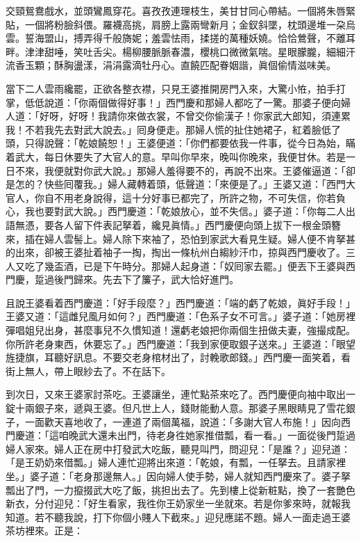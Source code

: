 \begin{myquote} 
交頸鴛鴦戲水，並頭鸞鳳穿花。喜孜孜連理枝生，美甘甘同心帶結。一個將朱唇緊貼，一個將粉臉斜偎。羅襪高挑，肩膀上露兩彎新月；金釵斜墜，枕頭邊堆一朶烏雲。{}誓海盟山，搏弄得千般旖妮；羞雲怯雨，揉搓的萬種妖嬈。恰恰鶯聲，不離耳畔。津津甜唾，笑吐舌尖。楊柳腰脈脈春濃，櫻桃口微微氣喘。星眼朦朧，細細汗流香玉顆；酥胸盪漾，涓涓露滴牡丹心。直饒匹配眷姻諧，眞個偷情滋味美。
\end{myquote} 

當下二人雲雨纔罷，正欲各整衣襟，只見王婆推開房門入來，大驚小恠，拍手打掌，低低說道：{}「你兩個做得好事！」西門慶和那婦人都吃了一驚。那婆子便向婦人道：「好呀，好呀！我請你來做衣裳，不曾交你偷漢子！{}你家武大郎知，須連累我！不若我先去對武大說去。」囘身便走。那婦人慌的扯住她裙子，紅着臉低了頭，只得說聲：「乾娘饒恕！」{}王婆便道：「你們都要依我一件事，從今日為始，瞞着武大，每日休要失了大官人的意。早叫你早來，晚叫你晚來，我便甘休。若是一日不來，我便就對你武大說。」那婦人羞得要不的，再說不出來。王婆催逼道：「卻是怎的？快些囘覆我。」婦人藏轉着頭，低聲道：「來便是了。」王婆又道：「西門大官人，你自不用老身說得，這十分好事已都完了，所許之物，不可失信，{}你若負心，我也要對武大說。」西門慶道：「乾娘放心，並不失信。」婆子道：「你每二人出語無憑，要各人留下件表記拏着，纔見眞情。」西門慶便向頭上拔下一根金頭簪來，插在婦人雲髻上。婦人除下來袖了，恐怕到家武大看見生疑。婦人便不肯拏甚的出來，卻被王婆扯着袖子一掏，掏出一條杭州白縐紗汗巾，掠與西門慶收了。{}三人又吃了幾盃酒，已是下午時分。那婦人起身道：「奴囘家去罷。」便丟下王婆與西門慶，踅過後門歸來。先去下了簾子，武大恰好進門。

且說王婆看着西門慶道：「好手段麼？」西門慶道：「端的虧了乾娘，眞好手段！」王婆又道：「這雌兒風月如何？」西門慶道：「色系子女不可言。」婆子道：「她房裡彈唱姐兒出身，甚麼事兒不久慣知道！還虧老娘把你兩個生扭做夫妻，強撮成配。你所許老身東西，休要忘了。」西門慶道：「我到家便取銀子送來。」王婆道：「眼望旌捷旗，耳聽好訊息。不要交老身棺材出了，討輓歌郎錢。」{}西門慶一面笑着，看街上無人，帶上眼紗去了。不在話下。

到次日，又來王婆家討茶吃。王婆讓坐，連忙點茶來吃了。西門慶便向袖中取出一錠十兩銀子來，遞與王婆。但凡世上人，錢財能動人意。那婆子黑眼睛見了雪花銀子，一面歡天喜地收了，一連道了兩個萬福，說道：「多謝大官人布施！」{}因向西門慶道：「這咱晚武大還未出門，待老身徃她家推借瓢，看一看。」一面從後門踅過婦人家來。婦人正在房中打發武大吃飯，聽見叫門，問迎兒：「是誰？」迎兒道：「是王奶奶來借瓢。」婦人連忙迎將出來道：「乾娘，有瓢，一任拏去。且請家裡坐。」婆子道：「老身那邊無人。」因向婦人使手勢，婦人就知西門慶來了。{}婆子拏瓢出了門，一力攛掇武大吃了飯，挑担出去了。先到樓上從新粧點，換了一套艷色新衣，分付迎兒：「好生看家，我徃你王奶家坐一坐就來。若是你爹來時，就報我知道。若不聽我說，打下你個小賤人下截來。」迎兒應諾不題。婦人一面走過王婆茶坊裡來。正是：

